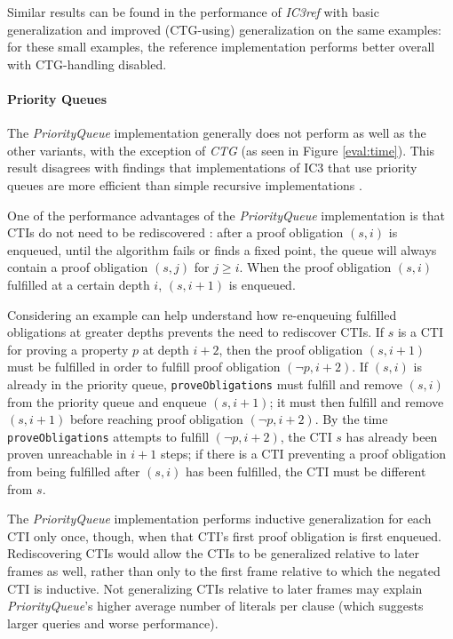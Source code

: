 \documentclass[12pt,a4paper,twoside,openright]{report}
\begin{document}
{{{Similar results can be found
in the performance of \emph{IC3ref} with basic generalization and
improved (CTG-using) generalization on the same examples: for these small examples,
the reference implementation performs better overall with CTG-handling disabled.}

\paragraph{Priority Queues}{
The \emph{PriorityQueue} implementation generally does not perform as well as the
other variants, with the exception of \emph{CTG} (as seen in Figure \ref{eval:time}).
This result disagrees with findings that implementations of IC3 that
use priority queues are more efficient than simple recursive implementations
\cite{een11,griggio14}.

One of the performance advantages of the \emph{PriorityQueue} implementation is that CTIs do not need
to be rediscovered \cite{een11}: after a proof obligation $(s,i)$ is enqueued, until the algorithm fails or finds a fixed point,
the queue will always contain a proof obligation $(s,j)$ for $j \geq i$. When the proof obligation $(s,i)$
fulfilled at a certain depth $i$, $(s,i + 1)$ is enqueued.

Considering an example can help understand how re-enqueuing fulfilled obligations at
greater depths prevents the need to rediscover CTIs.
If $s$ is a CTI for proving a property
$p$ at depth $i + 2$, then the proof obligation $(s, i+1)$ must be fulfilled
in order to fulfill proof obligation $(\neg p, i+2)$. If $(s,i)$ is already
in the priority queue, \verb,proveObligations, must fulfill and
remove $(s,i)$ from the
priority queue and enqueue $(s, i + 1)$; it must then fulfill and remove $(s, i + 1)$ before
reaching proof obligation $(\neg p, i + 2)$. By the time \verb,proveObligations,
attempts to fulfill $(\neg p, i + 2)$, the CTI $s$ has already been proven
unreachable in $i + 1$ steps; if there is a CTI preventing a proof obligation
from being fulfilled after $(s,i)$ has been fulfilled, the CTI must be different
from $s$.

The \emph{PriorityQueue} implementation performs inductive generalization for each CTI only once, though,
when that CTI's first proof obligation is first enqueued. Rediscovering CTIs would allow the CTIs to
be generalized relative to later frames as well, rather than only to the first frame relative to which
the negated CTI is inductive. Not generalizing CTIs relative to later frames may
explain \emph{PriorityQueue}'s higher average number of
literals per clause (which suggests larger queries and worse performance).
}

}}
\end{document}
